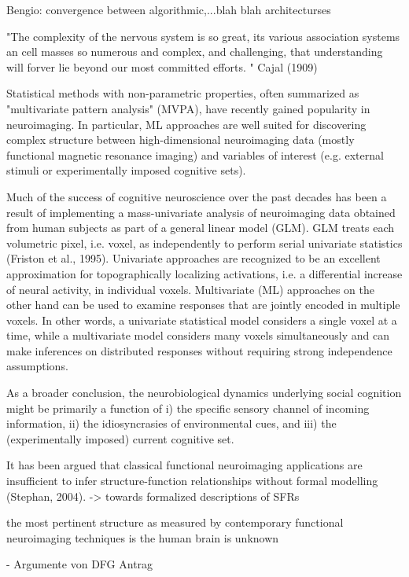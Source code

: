 \documentclass[authoryear,review,3p]{elsarticle}
\begin{document}
Bengio:
convergence between algorithmic,...blah blah architecturses

"The complexity of the nervous system is so great,
its various association systems an cell masses so numerous and
complex, and challenging,
that understanding will forver lie beyond our most committed efforts.
"
Cajal (1909)

Statistical methods with non-parametric properties, often summarized as "multivariate pattern analysis" (MVPA), have recently gained popularity in neuroimaging. In particular, ML approaches are well suited for discovering complex structure between high-dimensional neuroimaging data (mostly functional magnetic resonance imaging) and variables of interest (e.g. external stimuli or experimentally imposed cognitive sets). 

Much of the success of cognitive neuroscience over the past decades has been a result of implementing a mass-univariate analysis of neuroimaging data obtained from human subjects as part of a general linear model (GLM). GLM treats each volumetric pixel, i.e. voxel, as independently to perform serial univariate statistics (Friston et al., 1995). 
Univariate approaches are recognized to be an excellent approximation for topographically localizing activations, i.e. a differential increase of neural activity, in individual voxels. Multivariate (ML) approaches on the other hand can be used to examine responses that are jointly encoded in multiple voxels. In other words, a univariate statistical model considers a single voxel at a time, while a multivariate model considers many voxels simultaneously and can make inferences on distributed responses without requiring strong independence assumptions. 

As a broader conclusion, the neurobiological dynamics underlying social cognition might be primarily a function of i) the specific sensory channel of incoming information, ii) the idiosyncrasies of environmental cues, and iii) the (experimentally imposed) current cognitive set.



It has been argued that classical functional neuroimaging applications
are insufficient to infer structure-function relationships
without formal modelling (Stephan, 2004).
-> towards formalized descriptions of SFRs

the most pertinent structure as measured by
contemporary functional neuroimaging techniques
is the human brain is unknown

- Argumente von DFG Antrag
\end{document}
